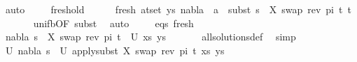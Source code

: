 \begin{isabellebody}
\ auto\isanewline
\isanewline
\ \ \ \isamarkupfalse%
\ fresh{\isacharunderscore}{\kern0pt}old\ \isanewline
\ \ \ \isamarkupfalse%
\ fresh{\isacharcolon}{\kern0pt}\ {\isachardoublequoteopen}{\isasymforall}{\isacharparenleft}{\kern0pt}a{\isacharcomma}{\kern0pt}t{\isacharparenright}{\kern0pt}{\isasymin}set\ ys{\isachardot}{\kern0pt}\ nabla{}\ {\isasymturnstile}\ a\ {\isasymsharp}\ subst\ {\isacharparenleft}{\kern0pt}s{}\ {\isasymbullet}\ {\isacharbrackleft}{\kern0pt}{\isacharparenleft}{\kern0pt}X{\isacharcomma}{\kern0pt}\ swap\ {\isacharparenleft}{\kern0pt}rev\ pi{\isacharparenright}{\kern0pt}\ t{\isacharprime}{\kern0pt}{\isacharparenright}{\kern0pt}{\isacharbrackright}{\kern0pt}{\isacharparenright}{\kern0pt}\ t{\isachardoublequoteclose}\isanewline
\ \ \ \ \ \isamarkupfalse%
\ unif{\isacharunderscore}{\kern0pt}{}b{\isacharbrackleft}{\kern0pt}OF\ subst{\isacharbrackright}{\kern0pt}\ \isamarkupfalse%
\ auto\isanewline
\isanewline
\ \ \ \isamarkupfalse%
\ eqs\ fresh\isanewline
\ \ \ \isamarkupfalse%
\ {\isachardoublequoteopen}{\isacharparenleft}{\kern0pt}nabla{}{\isacharcomma}{\kern0pt}\ {\isacharparenleft}{\kern0pt}s{}\ {\isasymbullet}\ {\isacharbrackleft}{\kern0pt}{\isacharparenleft}{\kern0pt}X{\isacharcomma}{\kern0pt}\ swap\ {\isacharparenleft}{\kern0pt}rev\ pi{\isacharparenright}{\kern0pt}\ t{\isacharprime}{\kern0pt}{\isacharparenright}{\kern0pt}{\isacharbrackright}{\kern0pt}{\isacharparenright}{\kern0pt}{\isacharparenright}{\kern0pt}\ {\isasymin}\ U\ {\isacharparenleft}{\kern0pt}xs{\isacharcomma}{\kern0pt}\ ys{\isacharparenright}{\kern0pt}{\isachardoublequoteclose}\isanewline
\ \ \ \ \ \isamarkupfalse%
\ all{\isacharunderscore}{\kern0pt}solutions{\isacharunderscore}{\kern0pt}def\ \isamarkupfalse%
\ simp\isanewline
\ \ \ \isamarkupfalse%
\ U{\isacharcolon}{\kern0pt}\ {\isachardoublequoteopen}{\isacharparenleft}{\kern0pt}nabla{}{\isacharcomma}{\kern0pt}\ s{}{\isacharparenright}{\kern0pt}\ {\isasymin}\ U\ {\isacharparenleft}{\kern0pt}apply{\isacharunderscore}{\kern0pt}subst\ {\isacharbrackleft}{\kern0pt}{\isacharparenleft}{\kern0pt}X{\isacharcomma}{\kern0pt}\ swap\ {\isacharparenleft}{\kern0pt}rev\ pi{\isacharparenright}{\kern0pt}\ t{\isacharprime}{\kern0pt}{\isacharparenright}{\kern0pt}{\isacharbrackright}{\kern0pt}\ {\isacharparenleft}{\kern0pt}xs{\isacharcomma}{\kern0pt}\ ys{\isacharparenright}{\kern0pt}{\isacharparenright}{\kern0pt}{\isachardoublequoteclose}\isanewline

\end{isabellebody}
